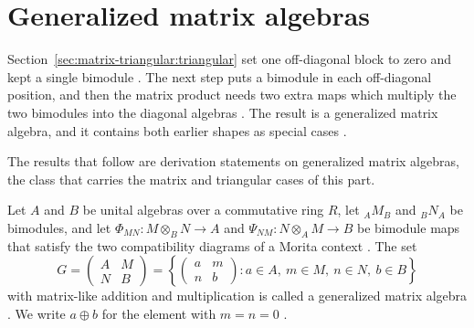 \section{Generalized matrix algebras}\label{sec:matrix-triangular:generalized-matrix}

Section~\ref{sec:matrix-triangular:triangular} set one off-diagonal block to zero
and kept a single bimodule \cite[p.~119]{Cheung2001}. The next step puts a bimodule
in each off-diagonal position, and then the matrix product needs two extra maps
which multiply the two bimodules into the diagonal algebras
\cite[p.~2720]{DuWang2012}. The result is a generalized matrix algebra, and it
contains both earlier shapes as special cases \cite[p.~2720]{DuWang2012}.

The results that follow are derivation statements on generalized matrix algebras, the class that carries the matrix and triangular cases of this part.

\begin{definition}\label{def:generalized:algebra}
Let $A$ and $B$ be unital algebras over a commutative ring $R$, let ${}_A M_B$ and
${}_B N_A$ be bimodules, and let $\Phi_{MN}\colon M\otimes_B N\to A$ and
$\Psi_{NM}\colon N\otimes_A M\to B$ be bimodule maps that satisfy the two
compatibility diagrams of a Morita context \cite[pp.~2719--2720]{DuWang2012}. The set
\[
G=\begin{pmatrix} A & M\\ N & B\end{pmatrix}
=\left\{\begin{pmatrix} a & m\\ n & b\end{pmatrix}:
a\in A,\ m\in M,\ n\in N,\ b\in B\right\}
\]
with matrix-like addition and multiplication is called a generalized matrix
algebra \cite[p.~2720]{DuWang2012}. We write $a\oplus b$ for the element with
$m=n=0$ \cite[p.~2720]{DuWang2012}.
\end{definition}

